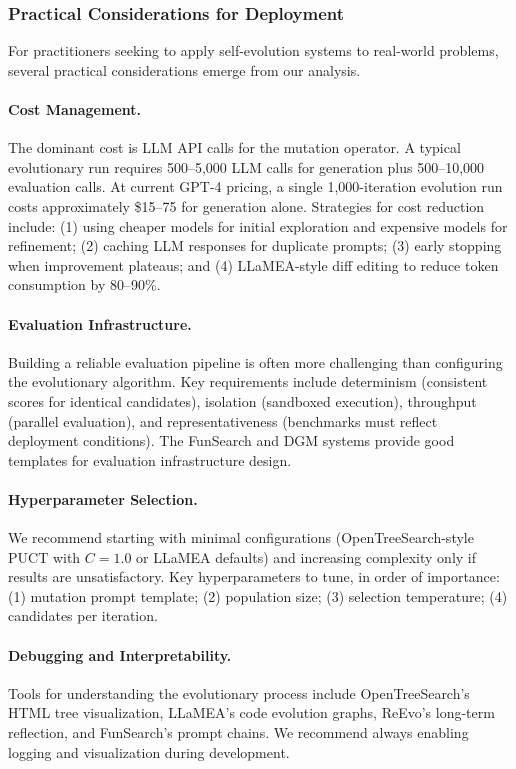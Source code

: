 \subsubsection{Practical Considerations for Deployment}

For practitioners seeking to apply self-evolution systems to real-world problems, several practical considerations emerge from our analysis.

\paragraph{Cost Management.}
The dominant cost is LLM API calls for the mutation operator. A typical evolutionary run requires 500--5,000 LLM calls for generation plus 500--10,000 evaluation calls. At current GPT-4 pricing, a single 1,000-iteration evolution run costs approximately \$15--75 for generation alone. Strategies for cost reduction include: (1) using cheaper models for initial exploration and expensive models for refinement; (2) caching LLM responses for duplicate prompts; (3) early stopping when improvement plateaus; and (4) LLaMEA-style diff editing to reduce token consumption by 80--90\%.

\paragraph{Evaluation Infrastructure.}
Building a reliable evaluation pipeline is often more challenging than configuring the evolutionary algorithm. Key requirements include determinism (consistent scores for identical candidates), isolation (sandboxed execution), throughput (parallel evaluation), and representativeness (benchmarks must reflect deployment conditions). The FunSearch and DGM systems provide good templates for evaluation infrastructure design.

\paragraph{Hyperparameter Selection.}
We recommend starting with minimal configurations (OpenTreeSearch-style PUCT with $C=1.0$ or LLaMEA defaults) and increasing complexity only if results are unsatisfactory. Key hyperparameters to tune, in order of importance: (1) mutation prompt template; (2) population size; (3) selection temperature; (4) candidates per iteration.

\paragraph{Debugging and Interpretability.}
Tools for understanding the evolutionary process include OpenTreeSearch's HTML tree visualization, LLaMEA's code evolution graphs, ReEvo's long-term reflection, and FunSearch's prompt chains. We recommend always enabling logging and visualization during development.


